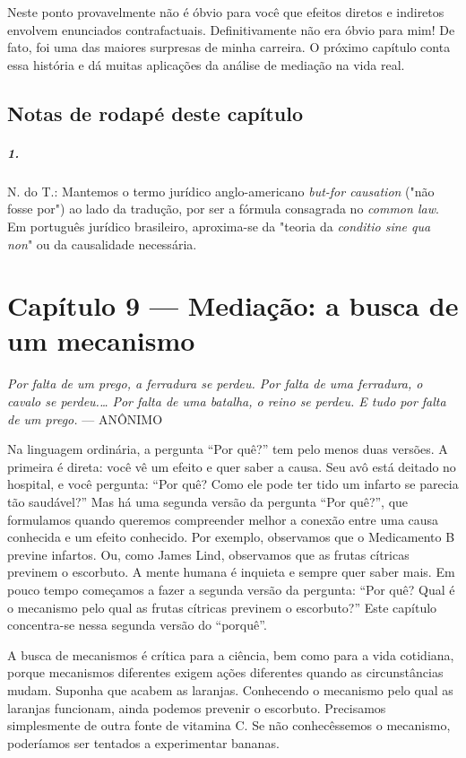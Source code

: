 \documentclass[11pt,a5paper,twoside]{book}
\begin{document}
Neste ponto provavelmente não é óbvio para você que efeitos diretos e indiretos envolvem enunciados contrafactuais. Definitivamente não era óbvio para mim! De fato, foi uma das maiores surpresas de minha carreira. O próximo capítulo conta essa história e dá muitas aplicações da análise de mediação na vida real.

\section*{Notas de rodapé deste capítulo}
\paragraph{1.} N. do T.: Mantemos o termo jurídico anglo-americano \textit{but-for causation} ("não fosse por") ao lado da tradução, por ser a fórmula consagrada no \textit{common law}. Em português jurídico brasileiro, aproxima-se da "teoria da \textit{conditio sine qua non}" ou da causalidade necessária.
\chapter{Capítulo 9 — Mediação: a busca de um mecanismo}
\textit{Por falta de um prego, a ferradura se perdeu. Por falta de uma ferradura, o cavalo se perdeu.… Por falta de uma batalha, o reino se perdeu. E tudo por falta de um prego.} — ANÔNIMO

Na linguagem ordinária, a pergunta “Por quê?” tem pelo menos duas versões. A primeira é direta: você vê um efeito e quer saber a causa. Seu avô está deitado no hospital, e você pergunta: “Por quê? Como ele pode ter tido um infarto se parecia tão saudável?” Mas há uma segunda versão da pergunta “Por quê?”, que formulamos quando queremos compreender melhor a conexão entre uma causa conhecida e um efeito conhecido. Por exemplo, observamos que o Medicamento B previne infartos. Ou, como James Lind, observamos que as frutas cítricas previnem o escorbuto. A mente humana é inquieta e sempre quer saber mais. Em pouco tempo começamos a fazer a segunda versão da pergunta: “Por quê? Qual é o mecanismo pelo qual as frutas cítricas previnem o escorbuto?” Este capítulo concentra-se nessa segunda versão do “porquê”.

A busca de mecanismos é crítica para a ciência, bem como para a vida cotidiana, porque mecanismos diferentes exigem ações diferentes quando as circunstâncias mudam. Suponha que acabem as laranjas. Conhecendo o mecanismo pelo qual as laranjas funcionam, ainda podemos prevenir o escorbuto. Precisamos simplesmente de outra fonte de vitamina C. Se não conhecêssemos o mecanismo, poderíamos ser tentados a experimentar bananas.
\end{document}
